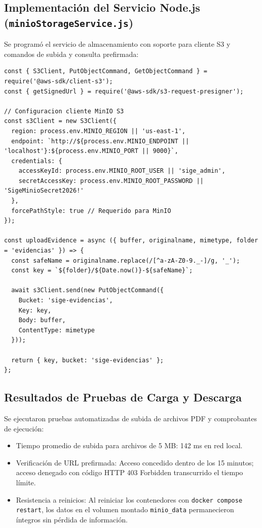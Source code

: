 \documentclass[12pt,a4paper]{article}
\begin{document}
\subsection{Implementación del Servicio Node.js (\texttt{minioStorageService.js})}
Se programó el servicio de almacenamiento con soporte para cliente S3 y comandos de subida y consulta prefirmada:

\begin{lstlisting}[caption={Método de subida y generación de URL prefirmada en minioStorageService.js}]
const { S3Client, PutObjectCommand, GetObjectCommand } = require('@aws-sdk/client-s3');
const { getSignedUrl } = require('@aws-sdk/s3-request-presigner');

// Configuracion cliente MinIO S3
const s3Client = new S3Client({
  region: process.env.MINIO_REGION || 'us-east-1',
  endpoint: `http://${process.env.MINIO_ENDPOINT || 'localhost'}:${process.env.MINIO_PORT || 9000}`,
  credentials: {
    accessKeyId: process.env.MINIO_ROOT_USER || 'sige_admin',
    secretAccessKey: process.env.MINIO_ROOT_PASSWORD || 'SigeMinioSecret2026!'
  },
  forcePathStyle: true // Requerido para MinIO
});

const uploadEvidence = async ({ buffer, originalname, mimetype, folder = 'evidencias' }) => {
  const safeName = originalname.replace(/[^a-zA-Z0-9._-]/g, '_');
  const key = `${folder}/${Date.now()}-${safeName}`;
  
  await s3Client.send(new PutObjectCommand({
    Bucket: 'sige-evidencias',
    Key: key,
    Body: buffer,
    ContentType: mimetype
  }));

  return { key, bucket: 'sige-evidencias' };
};
\end{lstlisting}

\subsection{Resultados de Pruebas de Carga y Descarga}
Se ejecutaron pruebas automatizadas de subida de archivos PDF y comprobantes de ejecución:
\begin{itemize}[leftmargin=1.5em, itemsep=1.5pt]
    \item Tiempo promedio de subida para archivos de 5 MB: 142 ms en red local.
    \item Verificación de URL prefirmada: Acceso concedido dentro de los 15 minutos; acceso denegado con código HTTP 403 Forbidden transcurrido el tiempo límite.
    \item Resistencia a reinicios: Al reiniciar los contenedores con \texttt{docker compose restart}, los datos en el volumen montado \texttt{minio\_data} permanecieron íntegros sin pérdida de información.
\end{itemize}
\end{document}
